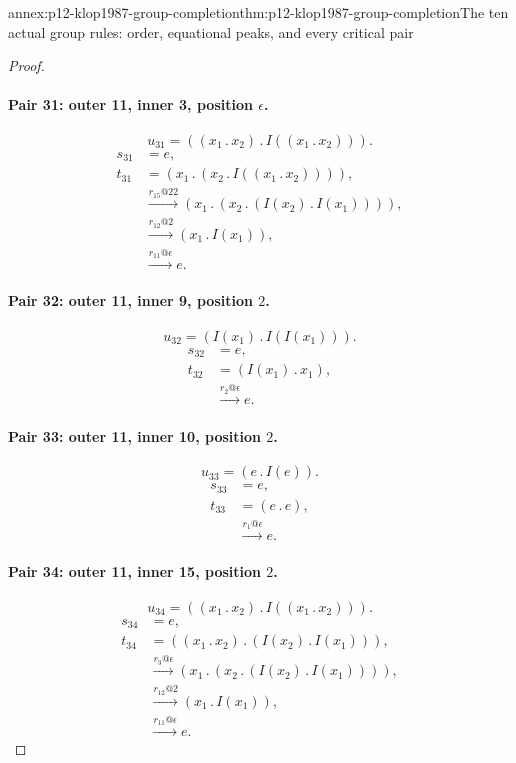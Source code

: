 \begin{annexitem}{annex:p12-klop1987-group-completion}{thm:p12-klop1987-group-completion}{The ten actual group rules: order, equational peaks, and every critical pair}
\begin{proof}
\paragraph{Pair 31: outer 11, inner 3, position \(\epsilon\).}
\[
 u_{31}=((x_{1}\mathbin{.}x_{2})\mathbin{.}I((x_{1}\mathbin{.}x_{2}))).
\]
\begin{align*}
 s_{31}&=e,\\
 t_{31}&=(x_{1}\mathbin{.}(x_{2}\mathbin{.}I((x_{1}\mathbin{.}x_{2})))),\\
 &\xrightarrow{r_{15}@22}(x_{1}\mathbin{.}(x_{2}\mathbin{.}(I(x_{2})\mathbin{.}I(x_{1})))),\\
 &\xrightarrow{r_{12}@2}(x_{1}\mathbin{.}I(x_{1})),\\
 &\xrightarrow{r_{11}@\epsilon}e.
\end{align*}

\paragraph{Pair 32: outer 11, inner 9, position \(2\).}
\[
 u_{32}=(I(x_{1})\mathbin{.}I(I(x_{1}))).
\]
\begin{align*}
 s_{32}&=e,\\
 t_{32}&=(I(x_{1})\mathbin{.}x_{1}),\\
 &\xrightarrow{r_{2}@\epsilon}e.
\end{align*}

\paragraph{Pair 33: outer 11, inner 10, position \(2\).}
\[
 u_{33}=(e\mathbin{.}I(e)).
\]
\begin{align*}
 s_{33}&=e,\\
 t_{33}&=(e\mathbin{.}e),\\
 &\xrightarrow{r_{1}@\epsilon}e.
\end{align*}

\paragraph{Pair 34: outer 11, inner 15, position \(2\).}
\[
 u_{34}=((x_{1}\mathbin{.}x_{2})\mathbin{.}I((x_{1}\mathbin{.}x_{2}))).
\]
\begin{align*}
 s_{34}&=e,\\
 t_{34}&=((x_{1}\mathbin{.}x_{2})\mathbin{.}(I(x_{2})\mathbin{.}I(x_{1}))),\\
 &\xrightarrow{r_{3}@\epsilon}(x_{1}\mathbin{.}(x_{2}\mathbin{.}(I(x_{2})\mathbin{.}I(x_{1})))),\\
 &\xrightarrow{r_{12}@2}(x_{1}\mathbin{.}I(x_{1})),\\
 &\xrightarrow{r_{11}@\epsilon}e.
\end{align*}


\end{proof}
\end{annexitem}
